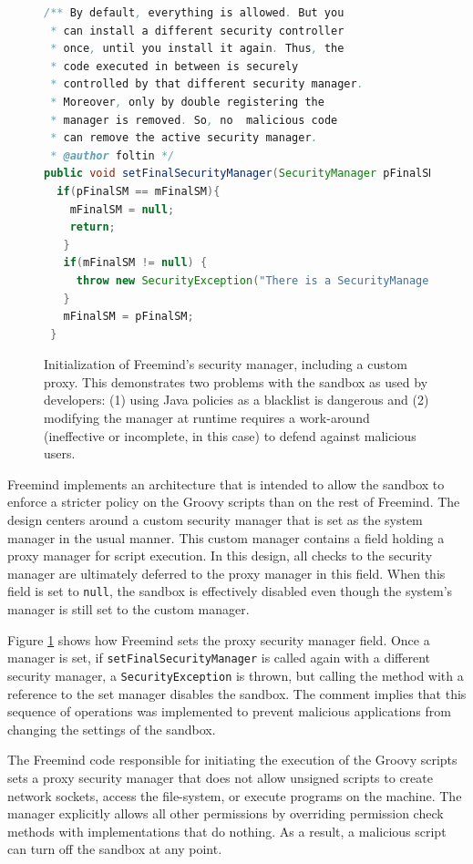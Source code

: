 \documentclass{sig-alternate}
\begin{document}
\begin{figure}
\begin{lstlisting}[language=Java,firstnumber=31]
/** By default, everything is allowed. But you
 * can install a different security controller
 * once, until you install it again. Thus, the
 * code executed in between is securely
 * controlled by that different security manager.  
 * Moreover, only by double registering the
 * manager is removed. So, no  malicious code 
 * can remove the active security manager.  
 * @author foltin */
public void setFinalSecurityManager(SecurityManager pFinalSM) {
  if(pFinalSM == mFinalSM){
    mFinalSM = null;
    return;
   } 		
   if(mFinalSM != null) {
     throw new SecurityException("There is a SecurityManager installed already."); 		
   } 		
   mFinalSM = pFinalSM;
 }	
\end{lstlisting}
\caption{Initialization of Freemind's 
  \label{fig:Freemind-Security-Manager} security manager, including a custom proxy.
  This demonstrates two problems with the sandbox as used by developers: (1) 
  using Java policies as a blacklist is
  dangerous and (2) modifying the manager at runtime requires 
  a work-around (ineffective or incomplete, in this case) to defend against malicious
  users.}
\end{figure}

Freemind implements an architecture that is intended to allow the
sandbox to enforce a stricter policy on the Groovy scripts than on
the rest of Freemind. The design centers around a custom
security manager that is set as the system manager in the usual manner.
This custom manager contains a field holding a proxy manager for
script execution. In this design, all checks to the security manager are
ultimately 
deferred to the proxy manager in this field. When
this field is set to \texttt{null}, the sandbox is effectively disabled
even though the system's manager is still set to the custom manager.

Figure \ref{fig:Freemind-Security-Manager} shows how Freemind sets
the proxy security manager field.
Once a manager is set, if \texttt{setFinalSecurityManager} is called
again with a different security manager, a \texttt{SecurityException}
is thrown, but calling the method with a reference to the set manager disables
the sandbox. The comment implies that this sequence
of operations was implemented to prevent malicious applications from
changing the settings of the sandbox.

The Freemind code responsible for initiating the execution of the
Groovy scripts sets a proxy security manager that does not allow unsigned
scripts to create network sockets, access the file-system, or execute
programs on the machine. The manager explicitly allows all other permissions by overriding permission check methods with implementations that do nothing. As a result, a malicious script can turn off the sandbox at any point.
\end{document}
